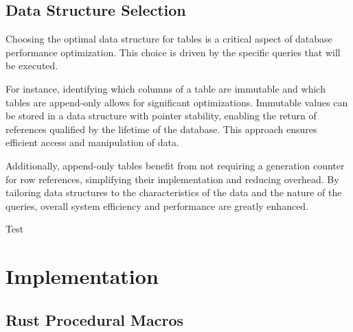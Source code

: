 \documentclass[conference]{IEEEtran}
\begin{document}
\subsection{Data Structure Selection}
%

Choosing the optimal data structure for tables is a critical aspect of database performance optimization.
This choice is driven by the specific queries that will be executed.

For instance, identifying which columns of a table are immutable and which tables are append-only
allows for significant optimizations. Immutable values can be stored in a data structure with pointer
stability, enabling the return of references qualified by the lifetime of the database. This approach
ensures efficient access and manipulation of data.

Additionally, append-only tables benefit from not requiring a generation counter for row references,
simplifying their implementation and reducing overhead. By tailoring data structures to the characteristics
of the data and the nature of the queries, overall system efficiency and performance are greatly
enhanced.


Test\cite{wagner2024incremental}
\section{Implementation}

\subsection{Rust Procedural Macros}



\end{document}
